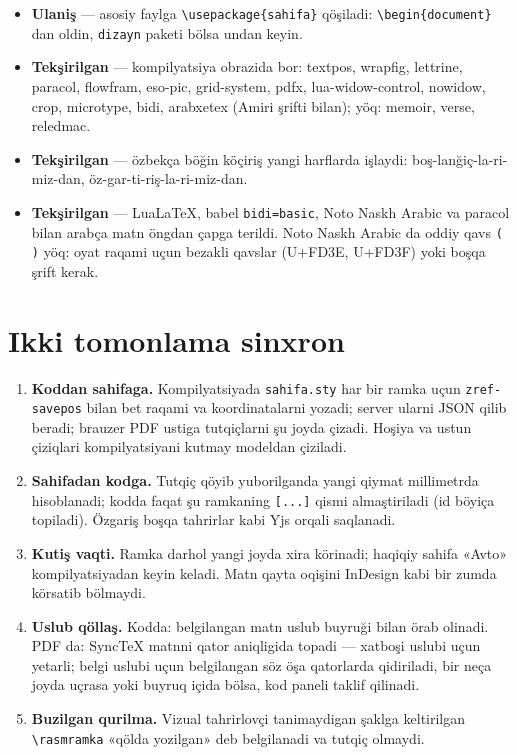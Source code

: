 \documentclass[11pt]{article}
\begin{document}
\begin{itemize}
\item \textbf{Ulaniş} --- asosiy faylga \texttt{\textbackslash usepackage\{sahifa\}} qöşiladi: \texttt{\textbackslash begin\{document\}} dan oldin, \texttt{dizayn} paketi bölsa undan keyin.
\item \textbf{Tekşirilgan} --- kompilyatsiya obrazida bor: textpos, wrapfig, lettrine, paracol, flowfram, eso-pic, grid-system, pdfx, lua-widow-control, nowidow, crop, microtype, bidi, arabxetex (Amiri şrifti bilan); yöq: memoir, verse, reledmac.
\item \textbf{Tekşirilgan} --- özbekça böğin köçiriş yangi harflarda işlaydi: boş-lanğiç-la-ri-miz-dan, öz-gar-ti-riş-la-ri-miz-dan.
\item \textbf{Tekşirilgan} --- LuaLaTeX, babel \texttt{bidi=basic}, Noto Naskh Arabic va paracol bilan arabça matn öngdan çapga terildi. Noto Naskh Arabic da oddiy qavs \texttt{( )} yöq: oyat raqami uçun bezakli qavslar (U+FD3E, U+FD3F) yoki boşqa şrift kerak.
\end{itemize}

\section{Ikki tomonlama sinxron}\label{sec:tl-sync}
\begin{enumerate}
\item \textbf{Koddan sahifaga.} Kompilyatsiyada \texttt{sahifa.sty} har bir ramka uçun \texttt{zref-savepos} bilan bet raqami va koordinatalarni yozadi; server ularni JSON qilib beradi; brauzer PDF ustiga tutqiçlarni şu joyda çizadi. Hoşiya va ustun çiziqlari kompilyatsiyani kutmay modeldan çiziladi.
\item \textbf{Sahifadan kodga.} Tutqiç qöyib yuborilganda yangi qiymat millimetrda hisoblanadi; kodda faqat şu ramkaning \texttt{[...]} qismi almaştiriladi (id böyiça topiladi). Özgariş boşqa tahrirlar kabi Yjs orqali saqlanadi.
\item \textbf{Kutiş vaqti.} Ramka darhol yangi joyda xira körinadi; haqiqiy sahifa «Avto» kompilyatsiyadan keyin keladi. Matn qayta oqişini InDesign kabi bir zumda körsatib bölmaydi.
\item \textbf{Uslub qöllaş.} Kodda: belgilangan matn uslub buyruği bilan örab olinadi. PDF da: SyncTeX matnni qator aniqligida topadi --- xatboşi uslubi uçun yetarli; belgi uslubi uçun belgilangan söz öşa qatorlarda qidiriladi, bir neça joyda uçrasa yoki buyruq içida bölsa, kod paneli taklif qilinadi.
\item \textbf{Buzilgan qurilma.} Vizual tahrirlovçi tanimaydigan şaklga keltirilgan \texttt{\textbackslash rasmramka} «qölda yozilgan» deb belgilanadi va tutqiç olmaydi.
\end{enumerate}
\end{document}
